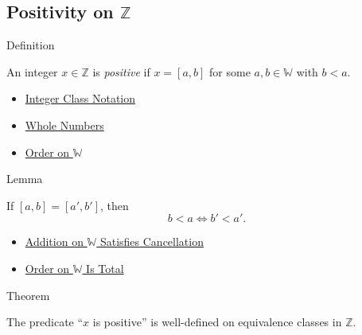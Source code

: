 \subsection*{Positivity on $\mathbb{Z}$}

\begin{definitionbox}{Definition}
\begin{definition}
\label{def:positive-integer}
An integer $x\in\mathbb{Z}$ is \emph{positive} if $x=[a,b]$ for some
$a,b\in\mathbb{W}$ with $b<a$.
\end{definition}
\end{definitionbox}

\begin{dependencies}
\begin{itemize}
  \item \hyperref[def:integer-class-notation]{Integer Class Notation}
  \item \hyperref[def:whole-numbers]{Whole Numbers}
  \item \hyperref[def:order-on-w]{Order on $\mathbb{W}$}
\end{itemize}
\end{dependencies}

\begin{lemmabox}{Lemma}
\begin{lemma}
\label{lem:positivity-respects-equivalence}
If $[a,b]=[a',b']$, then
\[
b<a \Longleftrightarrow b'<a'.
\]
\end{lemma}
\end{lemmabox}

\begin{dependencies}
\begin{itemize}
  \item \hyperref[thm:addition-on-w-cancellation]{Addition on $\mathbb{W}$ Satisfies Cancellation}
  \item \hyperref[thm:order-on-w-total]{Order on $\mathbb{W}$ Is Total}
\end{itemize}
\end{dependencies}

\begin{theorembox}{Theorem}
\begin{theorem}
\label{thm:positivity-on-z-well-defined}
The predicate ``$x$ is positive'' is well-defined on equivalence classes in
$\mathbb{Z}$.
\end{theorem}
\end{theorembox}

